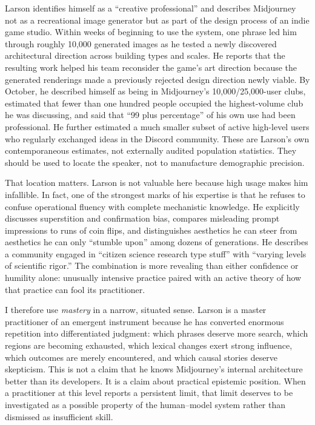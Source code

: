 \documentclass[11pt]{article}
\begin{document}
Larson identifies himself as a ``creative professional'' and describes Midjourney not as a recreational image generator but as part of the design process of an indie game studio. Within weeks of beginning to use the system, one phrase led him through roughly 10,000 generated images as he tested a newly discovered architectural direction across building types and scales. He reports that the resulting work helped his team reconsider the game's art direction because the generated renderings made a previously rejected design direction newly viable. By October, he described himself as being in Midjourney's 10,000/25,000-user clubs, estimated that fewer than one hundred people occupied the highest-volume club he was discussing, and said that ``99 plus percentage'' of his own use had been professional. He further estimated a much smaller subset of active high-level users who regularly exchanged ideas in the Discord community. These are Larson's own contemporaneous estimates, not externally audited population statistics. They should be used to locate the speaker, not to manufacture demographic precision.

That location matters. Larson is not valuable here because high usage makes him infallible. In fact, one of the strongest marks of his expertise is that he refuses to confuse operational fluency with complete mechanistic knowledge. He explicitly discusses superstition and confirmation bias, compares misleading prompt impressions to runs of coin flips, and distinguishes aesthetics he can steer from aesthetics he can only ``stumble upon'' among dozens of generations. He describes a community engaged in ``citizen science research type stuff'' with ``varying levels of scientific rigor.'' The combination is more revealing than either confidence or humility alone: unusually intensive practice paired with an active theory of how that practice can fool its practitioner.

I therefore use \emph{mastery} in a narrow, situated sense. Larson is a master practitioner of an emergent instrument because he has converted enormous repetition into differentiated judgment: which phrases deserve more search, which regions are becoming exhausted, which lexical changes exert strong influence, which outcomes are merely encountered, and which causal stories deserve skepticism. This is not a claim that he knows Midjourney's internal architecture better than its developers. It is a claim about practical epistemic position. When a practitioner at this level reports a persistent limit, that limit deserves to be investigated as a possible property of the human--model system rather than dismissed as insufficient skill.
\end{document}
